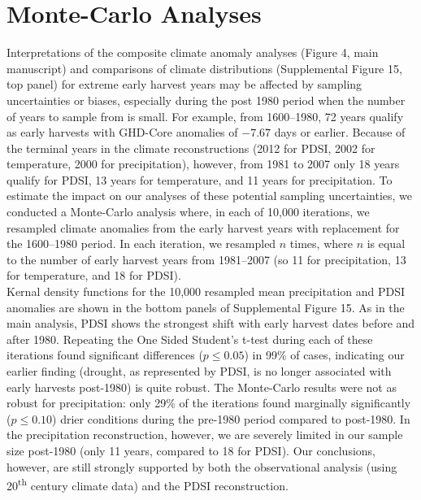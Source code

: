 \documentclass[12pt]{article}
\begin{document}
\section*{Monte-Carlo Analyses}
\noindent Interpretations of the composite climate anomaly analyses (Figure 4, main manuscript) and comparisons of climate distributions (Supplemental Figure 15, top panel) for extreme early harvest years may be affected by sampling uncertainties or biases, especially during the post 1980 period when the number of years to sample from is small. For example, from 1600--1980, 72 years qualify as early harvests with GHD-Core anomalies of $-7.67$ days or earlier. Because of the terminal years in the climate reconstructions (2012 for PDSI, 2002 for temperature, 2000 for precipitation), however, from 1981 to 2007 only 18 years qualify for PDSI, 13 years for temperature, and 11 years for precipitation. To estimate the impact on our analyses of these potential sampling uncertainties, we conducted a Monte-Carlo analysis where, in each of 10,000 iterations, we resampled climate anomalies from the early harvest years with replacement for the 1600--1980 period. In each iteration, we resampled $n$ times, where $n$ is equal to the number of early harvest years from 1981--2007 (so 11 for precipitation, 13 for temperature, and 18 for PDSI).\\
\indent Kernal density functions for the 10,000 resampled mean precipitation and PDSI anomalies are shown in the bottom panels of Supplemental Figure 15. As in the main analysis, PDSI shows the strongest shift with early harvest dates before and after 1980. Repeating the One Sided Student's t-test during each of these iterations found significant differences ($p\le0.05$) in 99\% of cases, indicating our earlier finding (drought, as represented by PDSI, is no longer associated with early harvests post-1980) is quite robust. The Monte-Carlo results were not as robust for precipitation: only 29\% of the iterations found marginally significantly ($p\le0.10$) drier conditions during the pre-1980 period compared to post-1980. In the precipitation reconstruction, however, we are severely limited in our sample size post-1980 (only 11 years, compared to 18 for PDSI). Our conclusions, however, are still strongly supported by both the observational analysis (using 20\textsuperscript{th} century climate data) and the PDSI reconstruction.

\pagebreak

\end{document}
